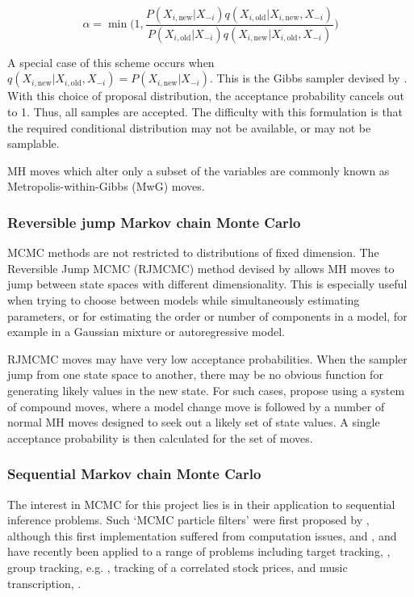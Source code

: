 \begin{equation}
\alpha %
= \min \bigg ( 1,  \frac{ P(X_{i,\text{new}}|X_{-i}) q(X_{i,\text{old}}|X_{i,\text{new}}, X_{-i}) }{ P(X_{i,\text{old}}|X_{-i}) q(X_{i,\text{new}}|X_{i,\text{old}}, X_{-i}) }  \bigg )
\label{eq:}
\end{equation}

A special case of this scheme occurs when $q(X_{i,\text{new}}|X_{i,\text{old}}, X_{-i}) = P(X_{i,\text{new}}|X_{-i})$. This is the Gibbs sampler devised by \cite{Geman1984}. With this choice of proposal distribution, the acceptance probability cancels out to 1. Thus, all samples are accepted. The difficulty with this formulation is that the required conditional distribution may not be available, or may not be samplable.

MH moves which alter only a subset of the variables are commonly known as Metropolis-within-Gibbs (MwG) moves.

\subsubsection{Reversible jump Markov chain Monte Carlo}
MCMC methods are not restricted to distributions of fixed dimension. The Reversible Jump MCMC (RJMCMC) method devised by \cite{Green1995} allows MH moves to jump between state spaces with different dimensionality. This is especially useful when trying to choose between models while simultaneously estimating parameters, or for estimating the order or number of components in a model, for example in a Gaussian mixture or autoregressive model.

RJMCMC moves may have very low acceptance probabilities. When the sampler jump from one state space to another, there may be no obvious function for generating likely values in the new state. For such cases, \cite{Al-Awadhi2004} propose using a system of compound moves, where a model change move is followed by a number of normal MH moves designed to seek out a likely set of state values. A single acceptance probability is then calculated for the set of moves. 

\subsubsection{Sequential Markov chain Monte Carlo}
The interest in MCMC for this project lies is in their application to sequential inference problems. Such `MCMC particle filters' were first proposed by \cite{Khan2005}, although this first implementation suffered from computation issues, and \cite{Golightly2006}, and have recently been applied to a range of problems including target tracking, \cite{Septier2009}, group tracking, e.g. \cite{Carmi2009}, tracking of a correlated stock prices, \cite{Pang2011} and music transcription, \cite{Bunch2010}.

